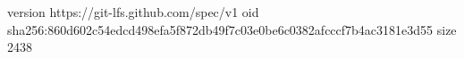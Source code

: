 version https://git-lfs.github.com/spec/v1
oid sha256:860d602c54edcd498efa5f872db49f7c03e0be6c0382afcccf7b4ac3181e3d55
size 2438
